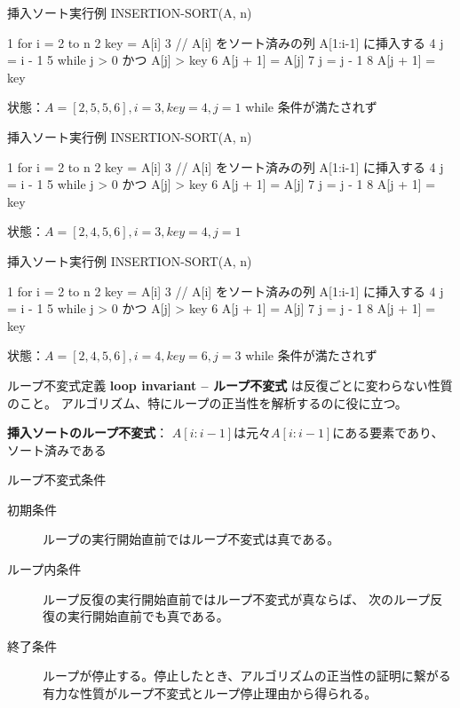 \documentclass[unicode,11pt,aspectratio=169,hide notes]{beamer} %
\begin{document}
\begin{frame}[fragile]{挿入ソート}{実行例}
  INSERTION-SORT(A, n)
  \begin{semiverbatim}
1  for i = 2 to n
2    key = A[i]
3    // A[i] をソート済みの列 A[1:i-1] に挿入する
4    j = i - 1
5    \alert{while j > 0 かつ A[j] > key}
6      A[j + 1] = A[j]
7      j = j - 1
8    A[j + 1] = key
  \end{semiverbatim}
  状態：$A = [2, 5, 5, 6], i = 3, key = 4, j = 1$ while 条件が満たされず
\end{frame}

\begin{frame}[fragile]{挿入ソート}{実行例}
  INSERTION-SORT(A, n)
  \begin{semiverbatim}
1  for i = 2 to n
2    key = A[i]
3    // A[i] をソート済みの列 A[1:i-1] に挿入する
4    j = i - 1
5    while j > 0 かつ A[j] > key
6      A[j + 1] = A[j]
7      j = j - 1
8    \alert{A[j + 1] = key}
  \end{semiverbatim}
  状態：$A = [2, 4, 5, 6], i = 3, key = 4, j = 1$
\end{frame}

\begin{frame}[fragile]{挿入ソート}{実行例}
  INSERTION-SORT(A, n)
  \begin{semiverbatim}
1  for i = 2 to n
2    key = A[i]
3    // A[i] をソート済みの列 A[1:i-1] に挿入する
4    j = i - 1
5    \alert{while j > 0 かつ A[j] > key}
6      A[j + 1] = A[j]
7      j = j - 1
8    A[j + 1] = key
  \end{semiverbatim}
  状態：$A = [2, 4, 5, 6], i = 4, key = 6, j = 3$ while 条件が満たされず
\end{frame}

\begin{frame}{ループ不変式}{定義}
  \textbf{loop invariant -- ループ不変式} は反復ごとに変わらない性質のこと。
  アルゴリズム、特にループの正当性を解析するのに役に立つ。

  \vspace{5mm}

  \textbf{挿入ソートのループ不変式}：
  $A[i:i-1]$は元々$A[i:i-1]$にある要素であり、ソート済みである
\end{frame}

\begin{frame}{ループ不変式}{条件}
  \begin{description}
    \item[初期条件] ループの実行開始直前ではループ不変式は真である。
    \item[ループ内条件] ループ反復の実行開始直前ではループ不変式が真ならば、
    次のループ反復の実行開始直前でも真である。
    \item[終了条件] ループが停止する。停止したとき、アルゴリズムの正当性の証明に繋がる
    有力な性質がループ不変式とループ停止理由から得られる。
  \end{description}
\end{frame}
\end{document}
